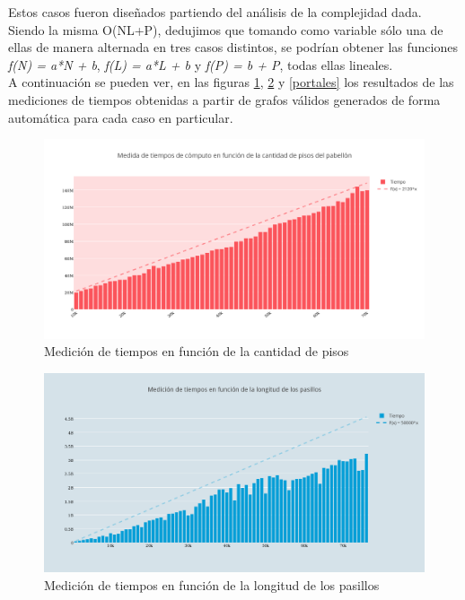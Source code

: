 Estos casos fueron diseñados partiendo del análisis de la complejidad dada. Siendo la misma O(NL+P), dedujimos que tomando como variable sólo una de ellas de manera alternada en tres casos distintos, se podrían obtener las funciones \textit{ f(N) = a*N + b},  \textit {f(L) = a*L + b} y \textit{f(P) = b + P}, todas ellas lineales. \\

A continuación se pueden ver, en las figuras \ref{pisos}, \ref{pasillos} y \ref{portales} los resultados de las mediciones de tiempos obtenidas a partir de grafos válidos  generados de forma automática para cada caso en particular.


\begin{figure}[H]
   \begin{center}
 	\includegraphics[width=18cm]{imagenes/ej2/f(pisos).png}
	\caption{Medición de tiempos en función de la cantidad de pisos}
	\label{pisos}
   \end{center}
 \end{figure}

 \begin{figure}[H]
   \begin{center}
 	\includegraphics[width=18cm]{imagenes/ej2/f(pasillos).png}
	\caption{Medición de tiempos en función de la longitud de los pasillos}
	\label{pasillos}
   \end{center}
 \end{figure}

